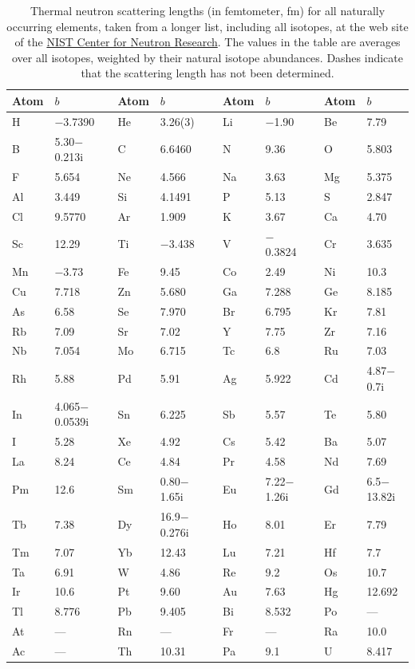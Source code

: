 \begin{table}[h!]
\centering\leavevmode
{\footnotesize\begin{tabular}{llcllcllcll}
\hline
Atom & $b$ & & Atom & $b$ &  & Atom & $b$ && Atom & $b$ \\
\hline\hline
H & $-$3.7390&& He & 3.26(3)&& Li &$-$1.90 && Be &7.79 \\
B &5.30$-$0.213$\mathrm{i}$ && C &6.6460 && N & 9.36&& O &5.803\\
F & 5.654&& Ne &4.566 && Na& 3.63&&Mg & 5.375\\
Al& 3.449&& Si &4.1491 && P &5.13 && S &2.847 \\
Cl& 9.5770&& Ar &1.909 && K &3.67 &&Ca & 4.70\\
\hline
Sc& 12.29&&Ti & $-$3.438 && V &$-$0.3824 &&Cr &3.635\\
Mn& $-$3.73&&Fe & 9.45&& Co& 2.49&& Ni &10.3 \\
Cu& 7.718&&Zn & 5.680&& Ga& 7.288&& Ge& 8.185\\
As & 6.58&&Se &7.970 &&Br &6.795 &&Kr &7.81 \\
Rb&7.09 &&Sr &7.02 && Y &7.75 && Zr &7.16 \\
\hline
Nb&7.054 &&Mo &6.715 &&Tc &6.8 &&Ru &7.03 \\
Rh&5.88 &&Pd &5.91 && Ag&5.922 && Cd&4.87$-$0.7$\mathrm{i}$\\
In &4.065$-$0.0539$\mathrm{i}$ &&Sn & 6.225&&Sb &5.57 &&Te & 5.80\\
I&5.28 &&Xe &4.92 &&Cs &5.42 &&Ba &5.07 \\
La&8.24 &&Ce &4.84 &&Pr &4.58 &&Nd &7.69 \\
\hline
Pm&12.6 &&Sm &0.80$-$1.65$\mathrm{i}$ &&Eu &7.22$-$1.26$\mathrm{i}$ &&Gd &6.5$-$13.82$\mathrm{i}$ \\
Tb& 7.38&&Dy &16.9$-$0.276$\mathrm{i}$ &&Ho &8.01 &&Er &7.79\\
Tm&7.07 &&Yb &12.43 &&Lu &7.21 &&Hf &7.7 \\
Ta&6.91 &&W &4.86 &&Re &9.2 &&Os & 10.7\\
Ir&10.6 &&Pt &9.60 &&Au &7.63 &&Hg &12.692 \\
\hline
Tl&8.776 &&Pb &9.405 &&Bi &8.532 &&Po &--- \\
At&--- &&Rn &--- &&Fr &--- &&Ra &10.0 \\
Ac&--- &&Th &10.31 &&Pa &9.1 &&U &8.417 \\
\hline
\end{tabular}}
\caption{\label{\chabbr:tb:neutronb}Thermal neutron scattering lengths (in femtometer, fm) for all naturally occurring elements, taken from a longer list, including all isotopes, at the web site of the \href{http://www.ncnr.nist.gov/resources/n-lengths/list.html}{NIST Center for Neutron Research}. The values in the table are averages over all isotopes, weighted by their natural isotope abundances. Dashes indicate that the scattering length has not been determined.}
\end{table}

